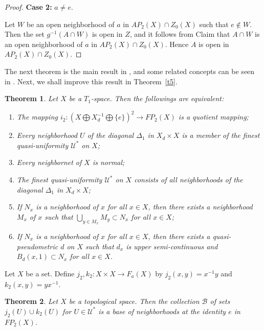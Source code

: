 \documentclass{amsart}
\newtheorem{theorem}{Theorem}[section]
\theoremstyle{definition}
\begin{document}
\begin{proof}
{\bf Case 2:} $a\neq e$.

Let $W$ be an open neighborhood of $a$ in $AP_{2}(X)\cap Z_{0}(X)$ such that $e\not\in W$. Then the set $g^{-1}(A\cap W)$ is open in $Z$, and it follows from Claim that $A\cap W$ is an open neighborhood of $a$ in $AP_{2}(X)\cap Z_{0}(X).$ Hence $A$ is open in $AP_{2}(X)\cap Z_{0}(X).$
\end{proof}

The next theorem is the main result in \cite{EN2013}, and some related concepts can be seen in \cite{F1982}. Next, we shall improve this result in Theorem~\ref{t5}.

\begin{theorem}\label{t4}\cite{EN2013}
Let $X$ be a $T_{1}$-space. Then the followings are equivalent:
\begin{enumerate}
\item The mapping $i_{2}: (X\bigoplus X_{d}^{-1}\bigoplus\{e\})^{2}\longrightarrow FP_{2}(X)$ is a quotient mapping;

\item  Every neighborhood $U$ of the diagonal $\Delta_{1}$ in $X_{d}\times X$ is a member of the finest quasi-uniformity $\mathscr{U}^{\ast}$ on $X$;

\item Every neighbornet of $X$ is normal;

\item The finest quasi-uniformity $\mathscr{U}^{\ast}$ on $X$ consists of all neighborhoods of the diagonal $\Delta_{1}$ in $X_{d}\times X$;

\item If $N_{x}$ is a neighborhood of $x$ for all $x\in X$, then there exists a neighborhood $M_{x}$ of $x$ such that $\bigcup_{y\in M_{x}}M_{y}\subset N_{x}$ for all $x\in X$;

\item If $N_{x}$ is a neighborhood of $x$ for all $x\in X$, then there exists a quasi-pseudometric $d$ on $X$ such that $d_{x}$ is upper semi-continuous and $B_{d}(x, 1)\subset N_{x}$ for all $x\in X$.
\end{enumerate}
\end{theorem}

Let $X$ be a set. Define $j_{2}, k_{2}: X\times X\longrightarrow F_{a}(X)$ by $j_{2}(x, y)=x^{-1}y$ and $k_{2}(x, y)=yx^{-1}$.

\begin{theorem}\label{t6}\cite{EN2013}
Let $X$ be a topological space. Then the collection $\mathscr{B}$ of sets $j_{2}(U)\cup k_{2}(U)$ for $U\in\mathscr{U}^{\ast}$ is a base of neighborhoods at the identity $e$ in $FP_{2}(X)$.
\end{theorem}
\end{document}
